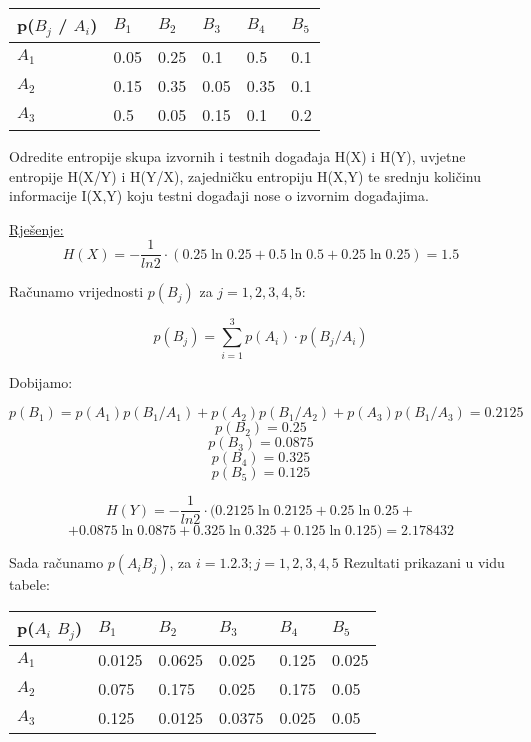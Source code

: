 \documentclass[12pt]{article}
\begin{document}
\begin{table}[hp]
\centering
\begin{tabular}{|l|l|l|l|l|l|}
\hline
p($B_j$ / $A_i$) & $B_1$  & $B_2$  & $B_3$  & $B_4$  & $B_5$ \\ \hline
$A_1$          & 0.05 & 0.25 & 0.1  & 0.5  & 0.1 \\ \hline
$A_2$          & 0.15 & 0.35 & 0.05 & 0.35 & 0.1 \\ \hline
$A_3$          & 0.5  & 0.05 & 0.15 & 0.1  & 0.2 \\ \hline
\end{tabular}
\end{table}

Odredite entropije skupa izvornih i testnih događaja H(X) i H(Y), uvjetne entropije H(X/Y) i H(Y/X), zajedničku entropiju H(X,Y) te srednju količinu informacije I(X,Y) koju testni događaji nose o izvornim događajima.

\underline{Rješenje:}\\


$$H(X) = - \frac{1}{ln 2} \cdot (0.25 \ln{0.25} + 0.5 \ln{0.5} + 0.25 \ln{0.25}) = 1.5$$

Računamo vrijednosti $p(B_j)$ za $j = 1, 2, 3, 4, 5$:

$$p(B_j) = \sum_{i = 1}^{3} p(A_i) \cdot p(B_j / A_i)$$

Dobijamo:

$$p(B_1) = p(A_1) p(B_1 / A_1) + p(A_2) p(B_1 / A_2) + p(A_3) p(B_1 / A_3) = 0.2125$$
$$p(B_2) = 0.25$$
$$p(B_3) = 0.0875$$
$$p(B_4) = 0.325$$
$$p(B_5) = 0.125$$

$$H(Y) =  - \frac{1}{ln 2} \cdot (0.2125 \ln{0.2125} + 0.25 \ln{0.25} +$$ 
$$+ 0.0875 \ln{0.0875} + 0.325 \ln{0.325}  + 0.125 \ln{0.125}) = 2.178432$$

Sada računamo $p(A_i B_j)$, za $i = 1. 2. 3 ; j = 1, 2, 3, 4, 5$ Rezultati prikazani u vidu tabele:

\begin{table}[hp]
\centering
\begin{tabular}{|l|l|l|l|l|l|}
\hline
p($A_i$ $B_j$) & $B_1$    & $B_2$    & $B_3$    & $B_4$   & $B_5$   \\ \hline
$A_1$          & 0.0125 & 0.0625 & 0.025  & 0.125 & 0.025 \\ \hline
$A_2$          & 0.075  & 0.175  & 0.025  & 0.175 & 0.05  \\ \hline
$A_3$         & 0.125  & 0.0125 & 0.0375 & 0.025 & 0.05  \\ \hline
\end{tabular}
\end{table}
\end{document}
